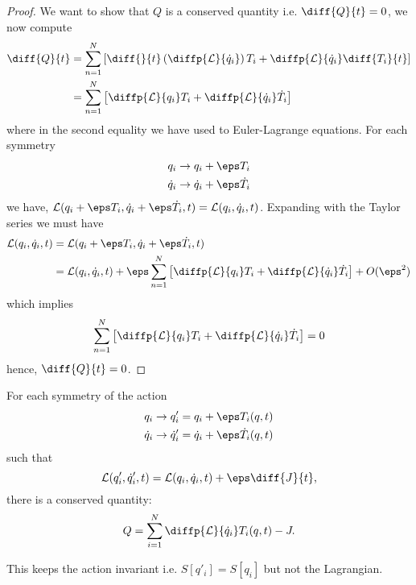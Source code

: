 \documentclass[12pt, a4paper]{article}
\newcommand{\LL}{\mathcal L}
\begin{document}
\begin{proof}
    We want to show that \(Q\) is a conserved quantity i.e. \(\diff{Q}{t}=0\), we now compute 
    \[\begin{aligned}
        \diff{Q}{t} &= \sum_{n=1}^{N} \left[ \diff{}{t}\left( \diffp{\mathcal{L}}{{\dot{q}_i}} \right)T_i+\diffp{\mathcal{L}}{{\dot{q}_i}}\diff{{T_i}}{t} \right] \\
        &= \sum_{n=1}^{N} \left[ \diffp{\LL}{{q_i}} T_i +\diffp{\LL}{{\dot{q}_i}} \dot{T}_i \right]
    \end{aligned}\]
    where in the second equality we have used to Euler-Lagrange equations. For each symmetry
    \[\begin{aligned}
        q_i &\to q_i +\eps T_i \\
        \dot{q}_i &\to \dot{q}_i+\eps \dot{T}_i
    \end{aligned}\]
    we have, \(\LL(q_i +\eps T_i,\dot{q}_i+\eps \dot{T}_i,t)=\LL(q_i,\dot{q}_i,t)\). Expanding with the Taylor series we must have 
    \[\begin{aligned}
    \LL(q_i,\dot{q}_i,t) &= \LL(q_i +\eps T_i,\dot{q}_i+\eps \dot{T}_i,t)\\
    &= \LL(q_i,\dot{q}_i,t) + \eps \sum_{n=1}^{N} \left[ \diffp{\LL}{{q_i}} T_i +\diffp{\LL}{{\dot{q}_i}} \dot{T}_i \right]+O(\eps^2)
    \end{aligned}\]
    which implies 
    \[\sum_{n=1}^{N} \left[ \diffp{\LL}{{q_i}} T_i +\diffp{\LL}{{\dot{q}_i}} \dot{T}_i \right] =0\]
    hence, \(\diff{Q}{t}=0\).
\end{proof}

\begin{mdthm}
    For each symmetry of the action
    \[\begin{aligned}
        q_i \to q'_i &= q_i + \eps T_i(q,t) \\
        \dot{q}_i \to \dot{q}'_i &= \dot{q}_i+\eps \dot{T}_i(q,t)
    \end{aligned}\]
    such that
    \[\mathcal{L}(q'_i,\dot{q}'_i,t)=\mathcal{L}(q_i,\dot{q}_i,t) + \eps\diff{J}{t},\]
    there is a conserved quantity:
    \[Q = \sum_{i=1}^{N} \diffp{\mathcal{L}}{{\dot{q}_i}} T_i(q,t) -J.\]
\end{mdthm}

\begin{mdremark}
    This keeps the action invariant i.e. \(S[q'_i]=S[q_i]\) but not the Lagrangian.
\end{mdremark}
\end{document}
